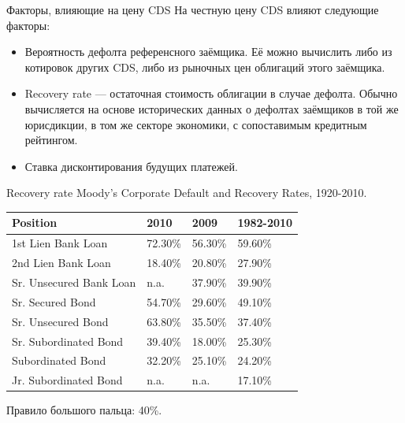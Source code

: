 \documentclass{beamer}
\begin{document}
\begin{frame}{Факторы, влияющие на цену CDS}
\justify
На честную цену CDS влияют следующие факторы:
\begin{itemize}
\justifying
\item Вероятность дефолта референсного заёмщика. Её можно вычислить либо из котировок других CDS, либо из рыночных цен облигаций этого заёмщика.
\item Recovery rate --- остаточная стоимость  облигации в случае дефолта. Обычно вычисляется на основе исторических данных о дефолтах заёмщиков в той же юрисдикции, в том же секторе экономики, с сопоставимым кредитным рейтингом.
\item Ставка дисконтирования будущих платежей.
\end{itemize}
\end{frame}



\begin{frame}{Recovery rate}
\justify
Moody's Corporate Default and Recovery Rates, 1920-2010.

\vspace{\baselineskip}
\begin{tabular}{l|l|l|l}
Position						& 2010		& 2009		& 1982-2010 \\
\hline
1st	Lien Bank Loan	 		& 72.30\%	& 56.30\% & 59.60\% \\
2nd Lien Bank Loan 		& 18.40\%	& 20.80\% & 27.90\% \\
Sr. Unsecured	Bank Loan	& n.a.		& 37.90\% & 39.90\% \\
Sr. Secured Bond			& 54.70\%	& 29.60\% & 49.10\%	 \\
\hline
Sr. Unsecured	Bond		& 63.80\%	& 35.50\% & 37.40\%	 \\
\hline
Sr. Subordinated Bond	& 39.40\%	& 18.00\% & 25.30\%	\\
Subordinated Bond		& 32.20\%	& 25.10\% & 24.20\%	\\
Jr. Subordinated Bond	 	& n.a.		& n.a.		&17.10\%	\\
\end{tabular}

\justify
Правило большого пальца: 40\%.
\end{frame}
\end{document}

